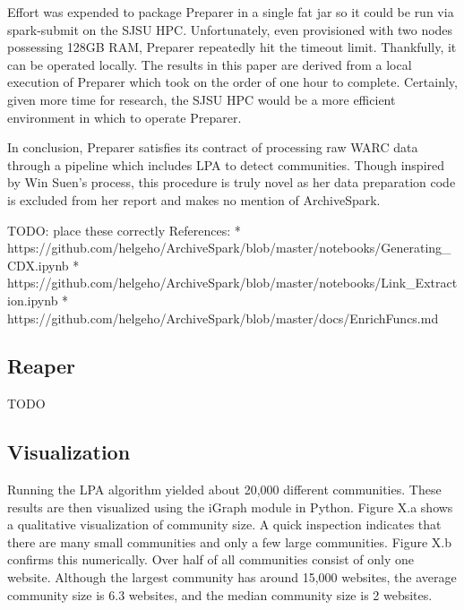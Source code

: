 \documentclass[conference]{IEEEtran}
\begin{document}
Effort was expended to package Preparer in a single fat jar so it could be run via spark-submit on the SJSU HPC. Unfortunately, even provisioned with two nodes possessing 128GB RAM, Preparer repeatedly hit the timeout limit. Thankfully, it can be operated locally. The results in this paper are derived from a local execution of Preparer which took on the order of one hour to complete. Certainly, given more time for research, the SJSU HPC would be a more efficient environment in which to operate Preparer.

In conclusion, Preparer satisfies its contract of processing raw WARC data through a pipeline which includes LPA to detect communities. Though inspired by Win Suen's process, this procedure is truly novel as her data preparation code is excluded from her report and makes no mention of ArchiveSpark.

TODO: place these correctly
References:
* https://github.com/helgeho/ArchiveSpark/blob/master/notebooks/Generating_CDX.ipynb
* https://github.com/helgeho/ArchiveSpark/blob/master/notebooks/Link_Extraction.ipynb
* https://github.com/helgeho/ArchiveSpark/blob/master/docs/EnrichFuncs.md

\subsection{Reaper}

TODO

\subsection{Visualization}

Running the LPA algorithm yielded about 20,000 different communities. These results are then visualized using the iGraph module in Python. Figure X.a shows a qualitative visualization of community size. A quick inspection indicates that there are many small communities and only a few large communities. Figure X.b confirms this numerically. Over half of all communities consist of only one website. Although the largest community has around 15,000 websites, the average community size is 6.3 websites, and the median community size is 2 websites.
\end{document}
